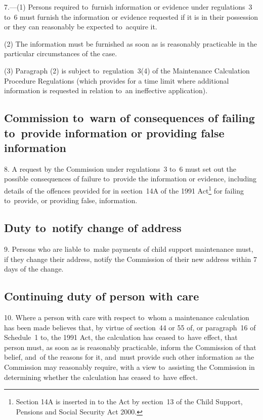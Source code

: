 \documentclass[12pt,a4paper]{article}
\begin{document}
7.---(1)  Persons required to~furnish information or evidence under regulations~3 to~6 must furnish the information or evidence requested if it is in their possession or they can reasonably be expected to~acquire it.

(2) The information must be furnished as soon as is reasonably practicable in the particular circumstances of the case.

(3) Paragraph (2) is subject to~regulation~3(4) of the Maintenance Calculation Procedure Regulations (which provides for a time limit where additional information is requested in relation to~an ineffective application).

\subsection[8. Commission to~warn of consequences of failing to~provide information or providing false information]{Commission to~warn of consequences of failing to~provide information or providing false information}

8.  A request by the Commission under regulations~3 to~6 must set out the possible consequences of failure to~provide the information or evidence, including details of the offences provided for in section~14A of the 1991 Act\footnote{Section 14A is inserted in to the Act by section~13 of the Child Support, Pensions and Social Security Act 2000.} for failing to~provide, or providing false, information.

\subsection[9. Duty to~notify change of address]{Duty to~notify change of address}

9.  Persons who are liable to~make payments of child support maintenance must, if they change their address, notify the Commission of their new address within 7 days of the change.

\subsection[10. Continuing duty of person with care]{Continuing duty of person with care}

10.  Where a person with care with respect to~whom a maintenance calculation has been made believes that, by virtue of section~44 or 55 of, or paragraph~16 of Schedule~1 to, the 1991 Act, the calculation has ceased to~have effect, that person must, as soon as is reasonably practicable, inform the Commission of that belief, and~of the reasons for it, and~must provide such other information as the Commission may reasonably require, with a view to~assisting the Commission in determining whether the calculation has ceased to~have effect.
\end{document}
